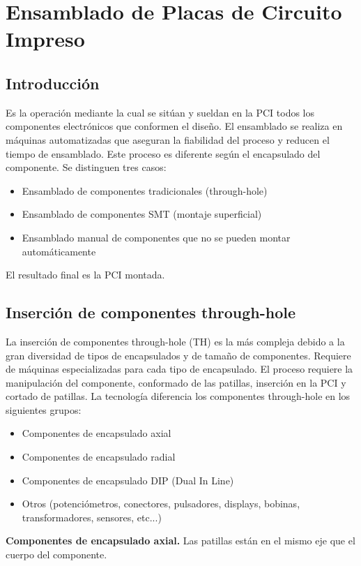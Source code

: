 \chapter{Ensamblado de Placas de Circuito Impreso}
\section{Introducción}
Es la operación mediante la cual se sitúan y sueldan en la PCI todos los componentes electrónicos que conformen el diseño. El ensamblado se realiza en máquinas automatizadas que aseguran la fiabilidad del proceso y reducen el tiempo de ensamblado. Este proceso es diferente según el encapsulado del componente. Se distinguen tres casos: 
\begin{itemize}
    \item Ensamblado de componentes tradicionales (through-hole)
    \item Ensamblado de componentes SMT (montaje superficial)
    \item Ensamblado manual de componentes que no se pueden montar automáticamente
\end{itemize}

El resultado final es la PCI montada.

\section{Inserción de componentes through-hole}
La inserción de componentes through-hole (TH) es la más compleja debido a la gran diversidad de tipos de encapsulados y de tamaño de componentes. Requiere de máquinas especializadas para cada tipo de encapsulado. El proceso requiere la manipulación del componente, conformado de las patillas, inserción en la PCI y cortado de patillas. La tecnología diferencia los componentes through-hole en los siguientes grupos:
\begin{itemize}
    \item Componentes de encapsulado axial
    \item Componentes de encapsulado radial
    \item Componentes de encapsulado DIP (Dual In Line)
    \item Otros (potenciómetros, conectores, pulsadores, displays, bobinas, transformadores, sensores, etc...)
\end{itemize}

\textbf{Componentes de encapsulado axial.} Las patillas están en el mismo eje que el cuerpo del componente.

